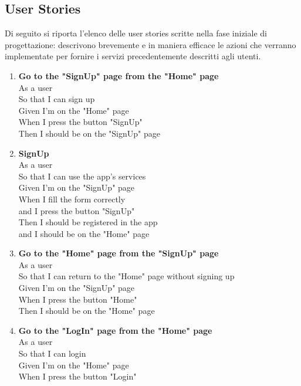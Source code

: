 \documentclass[Lau, binding=0.6cm, oneside]{sapthesis}
\begin{document}
\subsection{User Stories}
Di seguito si riporta l'elenco delle user stories scritte nella fase iniziale di progettazione: descrivono brevemente e in maniera efficace le azioni che verranno implementate per fornire i servizi precedentemente descritti agli utenti.\\

\begin{enumerate}
	\item \textbf{Go to the "SignUp" page from the "Home" page}\\
			As a user\\
			So that I can sign up\\
			Given I'm on the "Home" page\\
			When I press the button "SignUp"\\
			Then I should be on the "SignUp" page\\
	\item \textbf{SignUp}\\
			As a user\\
			So that I can use the app's services\\
			Given I'm on the "SignUp" page\\
			When I fill the form correctly\\
			and I press the button "SignUp"\\
			Then I should be registered in the app\\
			and I should be on the "Home" page\\
	\item \textbf{Go to the "Home" page from the "SignUp" page}\\
			As a user\\
			So that I can return to the "Home" page without signing up\\
			Given I’m on the "SignUp" page\\
			When I press the button "Home"\\
			Then I should be on the "Home" page\\
	\item \textbf{Go to the "LogIn" page from the "Home" page}\\
			As a user\\
			So that I can login\\
			Given I’m on the "Home" page\\
			When I press the button "Login"\\

\end{enumerate}
\end{document}
